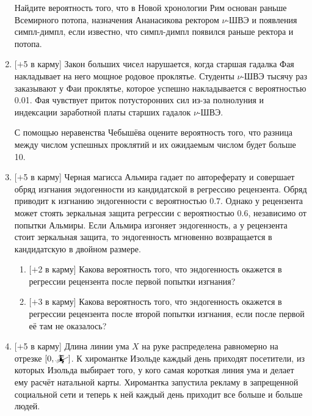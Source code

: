 \documentclass[12pt]{article}
\begin{document}
\begin{enumerate}
    Найдите вероятность того, что в Новой хронологии Рим основан раньше Всемирного потопа, назна\-че\-ния Ананасикова ректором $\nu$-ШВЭ и появления симпл-димпл, если известно, что симпл-димпл появился раньше ректора и потопа. 


    \item  $[+$5 в карму] Закон больших чисел нарушается, когда старшая гадалка Фая накладывает на него мощное родовое проклятье. Студенты $\nu$-ШВЭ тысячу раз заказывают у Фаи проклятье, которое успешно накладывается с вероятностью 0.01. Фая чувствует приток потусторонних сил из-за полно\-луния и индексации заработной платы старших гадалок $\nu$-ШВЭ.
    
    С помощью неравенства Чебышёва оцените вероятность того, что разница между числом успешных проклятий и их ожидаемым числом будет больше 10.
    
    
    \item  $[+$5 в карму] Черная магисса Альмира гадает по автореферату и совершает обряд изгнания эндоген\-нос\-ти из кандидатской в регрессию рецензента. Обряд приводит к изгнанию эндогенности с вероятностью $0.7$.
    Однако у рецензента может стоять зеркальная защита регрессии с вероятностью $0.6$, независимо от попытки Альмиры. Если Альмира изгоняет эндогенность, а у рецензента стоит зеркальная защита, то эндогенность мгновенно возвращается в кандидатскую в двойном размере. 

    \begin{enumerate}
        \item $[+$2 в карму] Какова вероятность того, что эндогенность окажется в регрессии рецензента после первой попытки изгнания?
        \item $[+$3 в карму] Какова вероятность того, что эндогенность окажется в регрессии рецензента после второй попытки изгнания, если после первой её там не оказалось?
    \end{enumerate}


    
    \item  %
    $[+$5 в карму] Длина линии ума $X$ на руке распределена равномерно на отрезке $[0, \mathwitch]$. К хиромантке  Изольде каждый день приходят посетители, из которых Изольда выбирает того, у кого самая короткая линия ума и делает ему расчёт натальной карты. Хиромантка запустила рекламу в зап\-ре\-щен\-ной социальной сети и теперь к ней каждый день приходит все больше и больше людей.


\end{enumerate}
\end{document}
